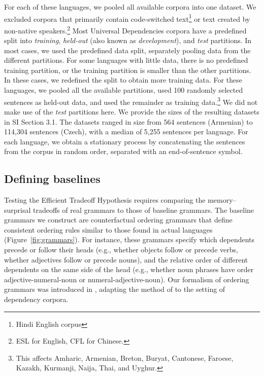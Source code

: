 For each of these languages, we pooled all available corpora into one dataset.
We excluded corpora that primarily contain code-switched text\footnote{Hindi English corpus} or text created by non-native speakers.\footnote{ESL for English, CFL for Chinese.}
Most Universal Dependencies corpora have a predefined split into \emph{training}, \emph{held-out} (also known as \emph{development}), and \emph{test} partitions.
In most cases, we used the predefined data split, separately pooling data from the different partitions. 
For some languages with little data, there is no predefined training partition, or the training partition is smaller than the other partitions.
In these cases, we redefined the split to obtain more training data.
For these languages, we pooled all the available partitions, used 100 randomly selected sentences as held-out data, and used the remainder as training data.\footnote{This affects Amharic, Armenian, Breton, Buryat, Cantonese, Faroese, Kazakh, Kurmanji, Naija, Thai, and Uyghur.}
We did not make use of the \textit{test} partitions here.
We provide the sizes of the resulting datasets in SI Section 3.1.
The datasets ranged in size from 564 sentences (Armenian) to 114,304 sentences (Czech), with a median of 5,255 sentences per language.
For each language, we obtain a stationary process by concatenating the sentences from the corpus in random order, separated with an end-of-sentence symbol.


\subsection{Defining baselines}\label{sec:baselines}

Testing the Efficient Tradeoff Hypothesis requires comparing the memory--surprisal tradeoffs of real grammars to those of baseline grammars. The baseline grammars we construct are counterfactual ordering grammars that define consistent ordering rules similar to those found in actual languages (Figure~\ref{fig:grammars}).
For instance, these grammars specify which dependents precede or follow their heads (e.g., whether objects follow or precede verbs, whether adjectives follow or precede nouns), and the relative order of different dependents on the same side of the head (e.g., whether noun phrases have order adjective-numeral-noun or numeral-adjective-noun). Our formalism of ordering grammars was introduced in \citet{hahn2020universals}, adapting the method of \citet{gildea-optimizing-2007,gildea-grammars-2010,gildea-human-2015} to the setting of dependency corpora.


